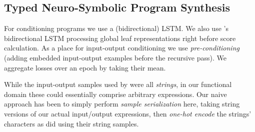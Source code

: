 \documentclass{article} %
\begin{document}
\vspace{-5pt}
\subsection{Typed Neuro-Symbolic Program Synthesis}
\vspace{-5pt}


For conditioning programs we use a (bidirectional) LSTM.
We also use \citet{nsps}'s bidirectional LSTM processing global leaf representations right before score calculation.
As a place for input-output conditioning we use \emph{pre-conditioning}
(adding embedded input-output examples before the recursive pass).
We aggregate losses over an epoch by taking their mean.



    While the input-output samples used by \citet{nsps} were all \emph{strings},
    in our functional domain these could essentially comprise arbitrary expressions.
    Our naive approach has been to simply perform \emph{sample serialization} here,
    taking string versions of our actual input/output expressions,
    then \emph{one-hot encode} the strings' characters as \citet{nsps} did using their string samples.


\end{document}
